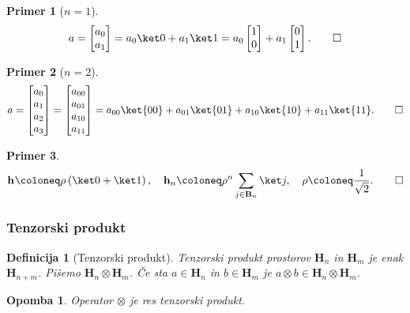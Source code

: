 \documentclass[a4paper]{article}
\newtheorem{definition}{Definicija}
\newtheorem*{example}{Primer}
\newtheorem*{opomba}{Opomba}
\newcommand{\hh}[1][]{\mathbf{h}_{#1}}
\newcommand{\B}[1][]{\mathbf{B}_{#1}}
\renewcommand{\H}[1][]{\mathbf{H}_{#1}}
\begin{document}
\begin{example}[\(n = 1\)]
    \[ 
        a = \begin{bmatrix}a_0 \\ a_1\end{bmatrix}
            = a_0\ket 0 + a_1\ket 1
            = a_0\begin{bmatrix}1 \\ 0\end{bmatrix} + a_1\begin{bmatrix}0 \\ 1\end{bmatrix}\text.\qedhere
    \]
\end{example}

\begin{example}[\(n = 2\)]
    \[
        a = \begin{bmatrix}a_0\\ a_1\\ a_2\\ a_3\end{bmatrix}
            = \begin{bmatrix}a_{00}\\ a_{01}\\ a_{10}\\ a_{11}\end{bmatrix}
            = a_{00}\ket{00} + a_{01}\ket{01} + a_{10}\ket{10} + a_{11}\ket{11}\text.\qedhere
    \]
\end{example}

\begin{example}%
    \[
        \hh \coloneq \rho \left(\ket 0 + \ket 1\right),\quad
        \hh[n] \coloneq \rho^n\sum_{j\in\B[n]} \ket j,\quad
        \rho \coloneq \frac{1}{\sqrt2}\text.\qedhere
        \]
\end{example}

\subsubsection{Tenzorski produkt}

\begin{definition}[Tenzorski produkt]
    Tenzorski produkt prostorov \( \H[n] \) in \( \H[m] \) je enak \( \H[n+m] \).
    Pišemo \( \H[n]\otimes\H[m] \). Če sta \( a\in\H[n] \) in \( b\in\H[m] \) je \( a\otimes b \in \H[n]\otimes\H[m] \).
\end{definition}
\begin{opomba}
    Operator \(\otimes\) je res tenzorski produkt.
\end{opomba}
\end{document}
